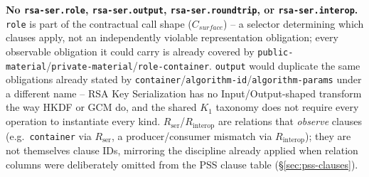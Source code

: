\documentclass[11pt,a4paper]{article}
\begin{document}
\textbf{No \texttt{rsa-ser.role}, \texttt{rsa-ser.output}, \texttt{rsa-ser.roundtrip}, or \texttt{rsa-ser.interop}.} \texttt{role} is part of the contractual call shape ($C_{surface}$) -- a selector determining which clauses apply, not an independently violable representation obligation; every observable obligation it could carry is already covered by \texttt{public-material}/\texttt{private-material}/\texttt{role-container}. \texttt{output} would duplicate the same obligations already stated by \texttt{container}/\texttt{algorithm-id}/\texttt{algorithm-params} under a different name -- RSA Key Serialization has no Input/Output-shaped transform the way HKDF or GCM do, and the shared $K_1$ taxonomy does not require every operation to instantiate every kind. $R_{\text{ser}}$/$R_{\text{interop}}$ are relations that \emph{observe} clauses (e.g.\ \texttt{container} via $R_{\text{ser}}$, a producer/consumer mismatch via $R_{\text{interop}}$); they are not themselves clause IDs, mirroring the discipline already applied when relation columns were deliberately omitted from the PSS clause table (\S\ref{sec:pss-clauses}).
\end{document}
